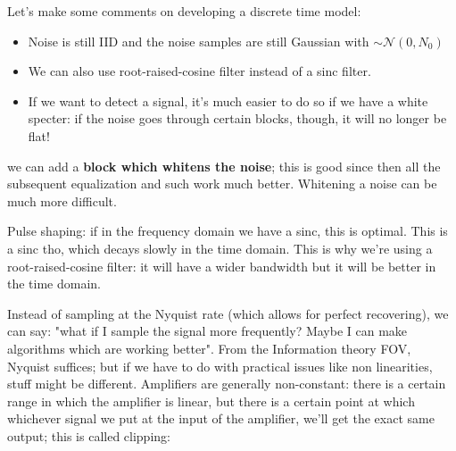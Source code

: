 \documentclass[a4paper, 12pt]{book}
\begin{document}
Let's make some comments on developing a discrete time model:
\begin{itemize}
    \item Noise is still IID and the noise samples are still Gaussian with $\sim \mathcal{N}(0, N_0)$
    \item We can also use root-raised-cosine filter instead of a sinc filter.
    \item If we want to detect a signal, it's much easier to do so if we have a white specter: if the noise goes through certain blocks, though, it will no longer be flat!
\end{itemize}

\begin{center}
\end{center}

we can add a \textbf{block which whitens the noise}; this is good since then all the subsequent equalization and such work much better.
Whitening a noise can be much more difficult.

Pulse shaping: if in the frequency domain we have a sinc, this is optimal. This is a sinc tho, which decays slowly in the time domain.
This is why we're using a root-raised-cosine filter: it will have a wider bandwidth but it will be better in the time domain.

Instead of sampling at the Nyquist rate (which allows for perfect recovering), we can say: "what if I sample the signal more frequently? Maybe I can make algorithms which are working better". From the Information theory FOV, Nyquist suffices; but if we have to do with practical issues like non linearities, stuff might be different.
Amplifiers are generally non-constant: there is a certain range in which the amplifier is linear, but there is a certain point at which whichever signal we put at the input of the amplifier, we'll get the exact same output; this is called clipping:
\end{document}
